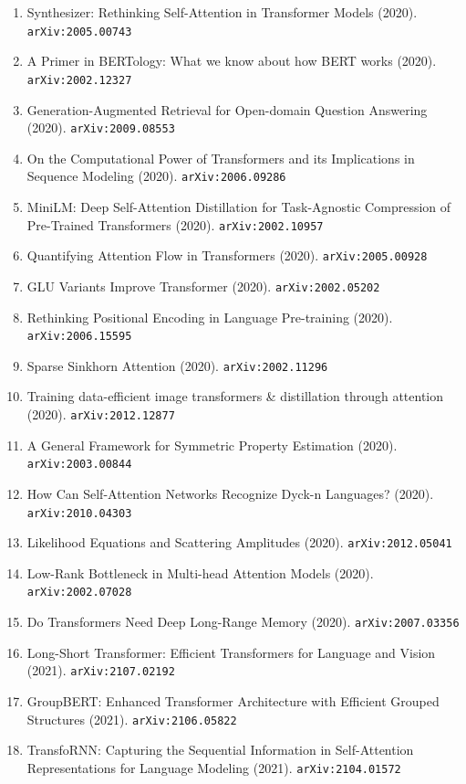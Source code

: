 \documentclass[11pt]{article}
\begin{document}
\begin{enumerate}
  \item Synthesizer: Rethinking Self-Attention in Transformer Models (2020). \texttt{arXiv:2005.00743}
  \item A Primer in BERTology: What we know about how BERT works (2020). \texttt{arXiv:2002.12327}
  \item Generation-Augmented Retrieval for Open-domain Question Answering (2020). \texttt{arXiv:2009.08553}
  \item On the Computational Power of Transformers and its Implications in
  Sequence Modeling (2020). \texttt{arXiv:2006.09286}
  \item MiniLM: Deep Self-Attention Distillation for Task-Agnostic Compression
  of Pre-Trained Transformers (2020). \texttt{arXiv:2002.10957}
  \item Quantifying Attention Flow in Transformers (2020). \texttt{arXiv:2005.00928}
  \item GLU Variants Improve Transformer (2020). \texttt{arXiv:2002.05202}
  \item Rethinking Positional Encoding in Language Pre-training (2020). \texttt{arXiv:2006.15595}
  \item Sparse Sinkhorn Attention (2020). \texttt{arXiv:2002.11296}
  \item Training data-efficient image transformers \& distillation through
  attention (2020). \texttt{arXiv:2012.12877}
  \item A General Framework for Symmetric Property Estimation (2020). \texttt{arXiv:2003.00844}
  \item How Can Self-Attention Networks Recognize Dyck-n Languages? (2020). \texttt{arXiv:2010.04303}
  \item Likelihood Equations and Scattering Amplitudes (2020). \texttt{arXiv:2012.05041}
  \item Low-Rank Bottleneck in Multi-head Attention Models (2020). \texttt{arXiv:2002.07028}
  \item Do Transformers Need Deep Long-Range Memory (2020). \texttt{arXiv:2007.03356}
  \item Long-Short Transformer: Efficient Transformers for Language and Vision (2021). \texttt{arXiv:2107.02192}
  \item GroupBERT: Enhanced Transformer Architecture with Efficient Grouped
  Structures (2021). \texttt{arXiv:2106.05822}
  \item TransfoRNN: Capturing the Sequential Information in Self-Attention
  Representations for Language Modeling (2021). \texttt{arXiv:2104.01572}

\end{enumerate}
\end{document}
